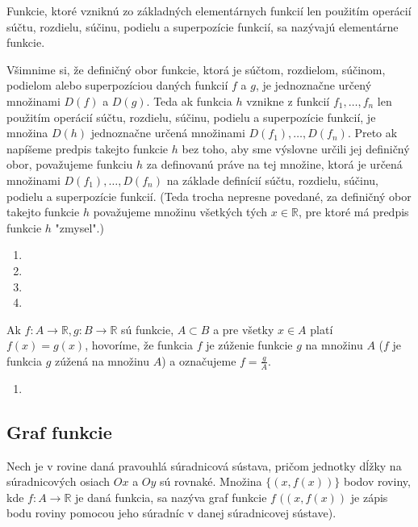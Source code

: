 Funkcie, ktoré vzniknú zo základných elementárnych funkcií len použitím
operácií súčtu, rozdielu, súčinu, podielu a superpozície funkcií, sa nazývajú
elementárne funkcie.

Všimnime si, že definičný obor funkcie, ktorá je súčtom, rozdielom, súčinom,
podielom alebo superpozíciou daných funkcií $f$ a $g$, je jednoznačne určený
množinami $D(f)$ a $D(g)$. Teda ak funkcia $h$ vznikne z funkcií
$f_1,\ldots,f_n$ len použitím operácií súčtu, rozdielu, súčinu, podielu a
superpozície funkcií, je množina $D(h)$ jednoznačne určená množinami
$D(f_1),\ldots,D(f_n)$. Preto ak napíšeme predpis takejto funkcie $h$ bez toho,
aby sme výslovne určili jej definičný obor, považujeme funkciu $h$ za
definovanú práve na tej množine, ktorá je určená množinami
$D(f_1),\ldots,D(f_n)$ na základe definícií súčtu, rozdielu, súčinu, podielu a
superpozície funkcií. (Teda trocha nepresne povedané, za definičný obor takejto
funkcie $h$ považujeme množinu všetkých tých $x\in\mathbb{R}$, pre ktoré má
predpis funkcie $h$ "zmysel".)

\begin{enumerate}[resume]
  \item {}
  \item {}
  \item {}
  \item {}
\end{enumerate}

Ak $f:A\rightarrow\mathbb{R},g:B\rightarrow\mathbb{R}$ sú funkcie, $A\subset B$ a pre všetky $x\in A$ platí $f(x)=g(x)$, hovoríme, že funkcia $f$ je zúženie funkcie $g$ na množinu $A$ ($f$ je funkcia $g$ zúžená na množinu $A$) a označujeme $f=\frac{g}{A}$.

\begin{enumerate}[resume]
  \item {}
\end{enumerate}

\subsection{Graf funkcie}
Nech je v rovine daná pravouhlá súradnicová sústava, pričom jednotky dĺžky na súradnicových osiach $Ox$ a $Oy$ sú rovnaké. Množina $\{(x,f(x))\}$ bodov roviny, kde $f:A\rightarrow\mathbb{R}$ je daná funkcia, sa nazýva graf funkcie $f$ $((x,f(x))$ je zápis bodu roviny pomocou jeho súradníc v danej súradnicovej sústave).

